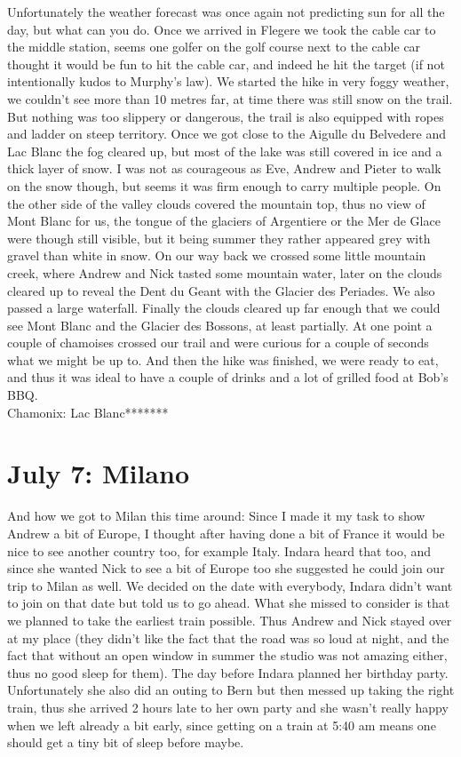 Unfortunately the weather forecast was once again not predicting sun for all the day, but what can you do. Once we arrived in Flegere we took the cable car to the middle station, seems one golfer on the golf course next to the cable car thought it would be fun to hit the cable car, and indeed he hit the target (if not intentionally kudos to Murphy's law). We started the hike in very foggy weather, we couldn't see more than 10 metres far, at time there was still snow on the trail. But nothing was too slippery or dangerous, the trail is also equipped with ropes and ladder on steep territory. Once we got close to the Aigulle du Belvedere and Lac Blanc the fog cleared up, but most of the lake was still covered in ice and a thick layer of snow. I was not as courageous as Eve, Andrew and Pieter to walk on the snow though, but seems it was firm enough to carry multiple people. On the other side of the valley clouds covered the mountain top, thus no view of Mont Blanc for us, the tongue of the glaciers of Argentiere or the Mer de Glace were though still visible, but it being summer they rather appeared grey with gravel than white in snow. On our way back we crossed some little mountain creek, where Andrew and Nick tasted some mountain water, later on the clouds cleared up to reveal the Dent du Geant with the Glacier des Periades. We also passed a large waterfall. Finally the clouds cleared up far enough that we could see Mont Blanc and the Glacier des Bossons, at least partially. At one point a couple of chamoises crossed our trail and were curious for a couple of seconds what we might be up to. And then the hike was finished, we were ready to eat, and thus it was ideal to have a couple of drinks and a lot of grilled food at Bob's BBQ.\\

Chamonix: Lac Blanc*******

\section{July 7: Milano}
\label{Milano2013}

And how we got to Milan this time around: Since I made it my task to show Andrew a bit of Europe, I thought after having done a bit of France it would be nice to see another country too, for example Italy. Indara heard that too, and since she wanted Nick to see a bit of Europe too she suggested he could join our trip to Milan as well. We decided on the date with everybody, Indara didn't want to join on that date but told us to go ahead. What she missed to consider is that we planned to take the earliest train possible. Thus Andrew and Nick stayed over at my place (they didn't like the fact that the road was so loud at night, and the fact that without an open window in summer the studio was not amazing either, thus no good sleep for them). The day before Indara planned her birthday party. Unfortunately she also did an outing to Bern but then messed up taking the right train, thus she arrived 2 hours late to her own party and she wasn't really happy when we left already a bit early, since getting on a train at 5:40 am means one should get a tiny bit of sleep before maybe.\\


